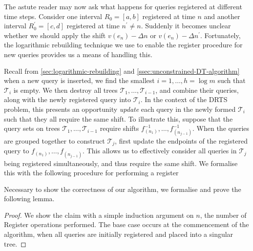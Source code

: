 The astute reader may now ask what happens for queries registered at different time steps. Consider one interval $R_0 = [a, b]$ registered at time $n$ and another interval $R^\prime_0 = [c,d]$ registered at time $n^\prime \neq n$. Suddenly it becomes unclear whether we should apply the shift $v(e_n) - \Delta n$ or $v(e_n) - \Delta n^\prime$. Fortunately, the logarithmic rebuilding technique we use to enable the register procedure for new queries provides us a means of handling this.

Recall from \cref{sec:logarithmic-rebuilding} and \cref{ssec:unconstrained-DT-algorithm} when a new query is inserted, we find the smallest $i = 1,\dots,h=\log m$ such that $\mathcal{T}_i$ is empty. We then destroy all trees $\mathcal{T}_1,\dots,\mathcal{T}_{i-1}$, and combine their queries, along with the newly registered query into $\mathcal{T}_i$. In the context of the DRTS problem, this presents an opportunity \textit{update} each query in the newly formed $\mathcal{T}_i$ such that they all require the same shift. To illustrate this, suppose that the query sets on trees $\mathcal{T}_1,\dots,\mathcal{T}_{i-1}$ require shifts $f^{-1}_{(n_1)},\dots,f^{-1}_{(n_{j-1})}$. When the queries are grouped together to construct $\mathcal{T}_{j}$, first update the endpoints of the registered query to $f_{(n_1)}, \dots, f_{(n_{j-1})}$. This allows us to effectively consider all queries in $\mathcal{T}_j$ being registered simultaneously, and thus require the same shift. We formalise this with the following procedure for performing a register

\begin{algorithm}\label{alg:DT+-register}
\begin{algorithmic}[1]
\State {}
\EndProcedure
\end{algorithmic}
\end{algorithm}

Necessary to show the correctness of our algorithm, we formalise and prove the following lemma.

\begin{lemma}
    
\end{lemma}
\begin{proof}
    We show the claim with a simple induction argument on $n$, the number of Register operations performed. The base case occurs at the commencement of the algorithm, when all queries are initially registered and placed into a singular tree.
\end{proof}

